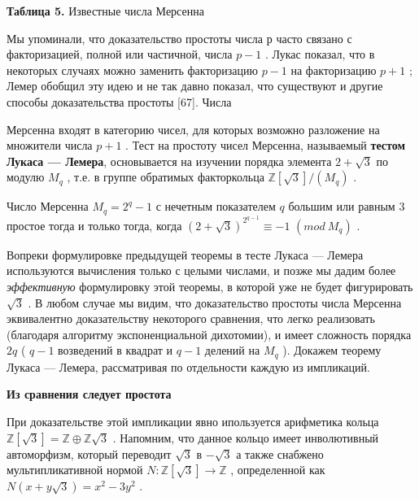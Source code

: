 \documentclass{mai_book}
\begin{document}
\begin{center}
{\bf Таблица 5.} Известные числа Мерсенна 
\end{center}

Мы упоминали, что доказательство простоты числа $р$ часто  
связано с факторизацией, полной или частичной, числа $p-1$
. Лукас  
показал, что в некоторых случаях можно заменить факторизацию $p-1$
 на 
факторизацию $p+1$
; Лемер обобщил эту идею и не так давно показал, 
что существуют и другие способы доказательства простоты [67]. Числа

\newpage

Мерсенна входят в категорию чисел, для которых возможно  
разложение на множители числа $p+1$
. 
Тест на простоту чисел Мерсенна, называемый {\bf тестом Лукаса — 
Лемера}, основывается на изучении порядка элемента $2+\sqrt 3$
 по модулю 
$M_q$
, т.е. в группе обратимых факторкольца $\mathbb{Z}[\sqrt 3]/(M_q)$
. 

\begin{thm}

Число Мерсенна $M_q = 2^q -1$
 с нечетным показателем $q$
 большим 
или равным 3
 простое тогда и только тогда, когда $(2+\sqrt 3)^{2^{q-1}}\equiv -1$ $(mod \ M_q)$
 . 
\end{thm}

Вопреки формулировке предыдущей теоремы в тесте Лукаса —  
Лемера используются вычисления только с целыми числами, и позже мы 
дадим более {\sl эффективную} формулировку этой теоремы, в которой уже 
не будет фигурировать $\sqrt 3$
. В любом случае мы видим, что  
доказательство простоты числа Мерсенна эквивалентно доказательству  
некоторого сравнения, что легко реализовать (благодаря алгоритму  
экспоненциальной дихотомии), и имеет сложность порядка $2q$
 ( $q-1$ возведений 
в квадрат и $q-1$
 делений на $M_q$
 ). Докажем теорему Лукаса — Лемера, 
рассматривая по отдельности каждую из импликаций. 

{\bf Из сравнения следует простота} 

При доказательстве этой импликации явно ипользуется арифметика 
кольца $\mathbb{Z}[\sqrt 3] = \mathbb{Z}\oplus\mathbb{Z}\sqrt 3$
. Напомним, что данное кольцо имеет инволютивный автоморфизм, который переводит $\sqrt 3$ в $-\sqrt 3$
 а также  
снабжено мультипликативной нормой $N : \mathbb{Z}[\sqrt 3]\rightarrow\mathbb{Z}$
, определенной как $N(x+y\sqrt 3)=x^2 - 3y^2$
. 
\end{document}
